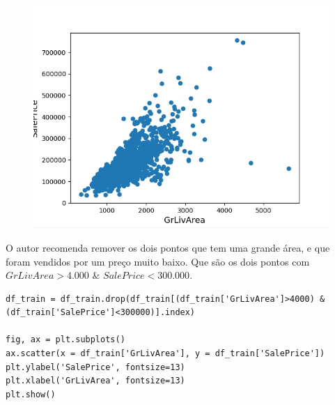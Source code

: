 \begin{figure}[H]
	\centering
	\includegraphics[keepaspectratio,width=1\textwidth]{img/outlier.png}
\end{figure}

O autor recomenda remover os dois pontos que tem uma grande área, e que foram vendidos por um preço muito baixo. Que são os dois pontos com $ GrLivArea > 4.000 $ \& $ SalePrice < 300.000 $.

\begin{lstlisting}
df_train = df_train.drop(df_train[(df_train['GrLivArea']>4000) & (df_train['SalePrice']<300000)].index)

fig, ax = plt.subplots()
ax.scatter(x = df_train['GrLivArea'], y = df_train['SalePrice'])
plt.ylabel('SalePrice', fontsize=13)
plt.xlabel('GrLivArea', fontsize=13)
plt.show()

\end{lstlisting}

